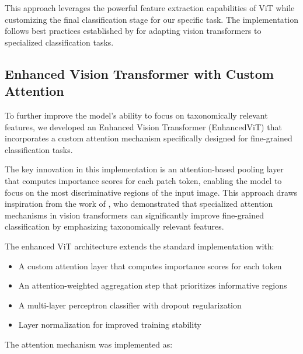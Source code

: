 \documentclass[a4paper,12pt]{article}
\begin{document}
This approach leverages the powerful feature extraction capabilities of ViT while customizing the final classification stage for our specific task. The implementation follows best practices established by \citep{wightman2021resnet} for adapting vision transformers to specialized classification tasks.

\subsection{Enhanced Vision Transformer with Custom Attention}

To further improve the model's ability to focus on taxonomically relevant features, we developed an Enhanced Vision Transformer (EnhancedViT) that incorporates a custom attention mechanism specifically designed for fine-grained classification tasks.

The key innovation in this implementation is an attention-based pooling layer that computes importance scores for each patch token, enabling the model to focus on the most discriminative regions of the input image. This approach draws inspiration from the work of \citep{guan2022attention}, who demonstrated that specialized attention mechanisms in vision transformers can significantly improve fine-grained classification by emphasizing taxonomically relevant features.

The enhanced ViT architecture extends the standard implementation with:

\begin{itemize}
    \item A custom attention layer that computes importance scores for each token
    \item An attention-weighted aggregation step that prioritizes informative regions
    \item A multi-layer perceptron classifier with dropout regularization
    \item Layer normalization for improved training stability
\end{itemize}

The attention mechanism was implemented as:

\end{document}

